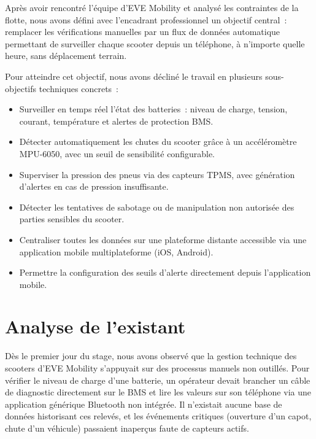 \documentclass[12pt, a4paper]{report}
\begin{document}
Après avoir rencontré l'équipe d'EVE Mobility et analysé les contraintes de la flotte,
nous avons défini avec l'encadrant professionnel un objectif central~: remplacer les
vérifications manuelles par un flux de données automatique permettant de surveiller
chaque scooter depuis un téléphone, à n'importe quelle heure, sans déplacement terrain.

Pour atteindre cet objectif, nous avons décliné le travail en plusieurs sous-objectifs
techniques concrets~:

\begin{itemize}
  \item Surveiller en temps réel l'état des batteries~: niveau de charge, tension,
        courant, température et alertes de protection BMS.
  \item Détecter automatiquement les chutes du scooter grâce à un accéléromètre
        MPU-6050, avec un seuil de sensibilité configurable.
  \item Superviser la pression des pneus via des capteurs TPMS, avec génération
        d'alertes en cas de pression insuffisante.
  \item Détecter les tentatives de sabotage ou de manipulation non autorisée des
        parties sensibles du scooter.
  \item Centraliser toutes les données sur une plateforme distante accessible via
        une application mobile multiplateforme (iOS, Android).
  \item Permettre la configuration des seuils d'alerte directement depuis
        l'application mobile.
\end{itemize}

\section{Analyse de l'existant}

Dès le premier jour du stage, nous avons observé que la gestion technique des scooters
d'EVE Mobility s'appuyait sur des processus manuels non outillés. Pour vérifier le
niveau de charge d'une batterie, un opérateur devait brancher un câble de diagnostic
directement sur le BMS et lire les valeurs sur son téléphone via une application
générique Bluetooth non intégrée. Il n'existait aucune base de données historisant
ces relevés, et les événements critiques (ouverture d'un capot, chute d'un véhicule)
passaient inaperçus faute de capteurs actifs.
\end{document}
